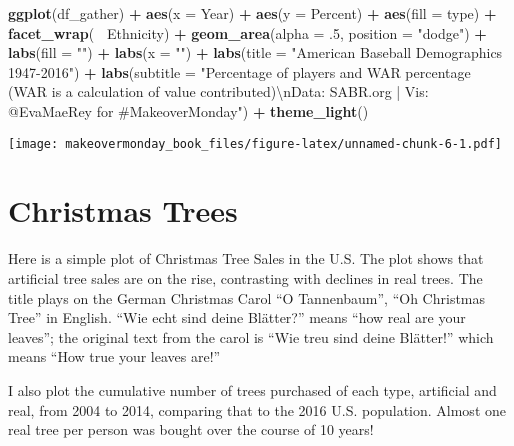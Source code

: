 \documentclass[]{book}
\newenvironment{Shaded}{\begin{snugshade}}{\end{snugshade}}
\newcommand{\KeywordTok}[1]{\textcolor[rgb]{0.13,0.29,0.53}{\textbf{#1}}}
\newcommand{\DataTypeTok}[1]{\textcolor[rgb]{0.13,0.29,0.53}{#1}}
\newcommand{\DecValTok}[1]{\textcolor[rgb]{0.00,0.00,0.81}{#1}}
\newcommand{\CharTok}[1]{\textcolor[rgb]{0.31,0.60,0.02}{#1}}
\newcommand{\StringTok}[1]{\textcolor[rgb]{0.31,0.60,0.02}{#1}}
\newcommand{\OperatorTok}[1]{\textcolor[rgb]{0.81,0.36,0.00}{\textbf{#1}}}
\newcommand{\NormalTok}[1]{#1}
\theoremstyle{definition}
\theoremstyle{definition}
\theoremstyle{definition}
\theoremstyle{remark}
\begin{document}
\begin{Shaded}
\begin{Highlighting}[]
\KeywordTok{ggplot}\NormalTok{(df_gather) }\OperatorTok{+}
\StringTok{  }\KeywordTok{aes}\NormalTok{(}\DataTypeTok{x =}\NormalTok{ Year) }\OperatorTok{+}
\StringTok{  }\KeywordTok{aes}\NormalTok{(}\DataTypeTok{y =}\NormalTok{ Percent) }\OperatorTok{+}
\StringTok{  }\KeywordTok{aes}\NormalTok{(}\DataTypeTok{fill =}\NormalTok{ type) }\OperatorTok{+}
\StringTok{  }\KeywordTok{facet_wrap}\NormalTok{(}\OperatorTok{~}\StringTok{ }\NormalTok{Ethnicity) }\OperatorTok{+}
\StringTok{  }\KeywordTok{geom_area}\NormalTok{(}\DataTypeTok{alpha =}\NormalTok{ .}\DecValTok{5}\NormalTok{, }\DataTypeTok{position =} \StringTok{"dodge"}\NormalTok{) }\OperatorTok{+}
\StringTok{  }\KeywordTok{labs}\NormalTok{(}\DataTypeTok{fill =} \StringTok{""}\NormalTok{) }\OperatorTok{+}
\StringTok{  }\KeywordTok{labs}\NormalTok{(}\DataTypeTok{x =} \StringTok{""}\NormalTok{) }\OperatorTok{+}
\StringTok{  }\KeywordTok{labs}\NormalTok{(}\DataTypeTok{title =} \StringTok{"American Baseball Demographics 1947-2016"}\NormalTok{) }\OperatorTok{+}
\StringTok{  }\KeywordTok{labs}\NormalTok{(}\DataTypeTok{subtitle =} \StringTok{"Percentage of players and WAR percentage (WAR is a calculation of value contributed)}\CharTok{\textbackslash{}n}\StringTok{Data: SABR.org | Vis: @EvaMaeRey for #MakeoverMonday"}\NormalTok{) }\OperatorTok{+}
\StringTok{  }\KeywordTok{theme_light}\NormalTok{() }
\end{Highlighting}
\end{Shaded}

\texttt{[image: makeovermonday\_book\_files/figure-latex/unnamed-chunk-6-1.pdf]}

\chapter{Christmas Trees}\label{christmas-trees}

Here is a simple plot of Christmas Tree Sales in the U.S. The plot shows
that artificial tree sales are on the rise, contrasting with declines in
real trees. The title plays on the German Christmas Carol ``O
Tannenbaum'', ``Oh Christmas Tree'' in English. ``Wie echt sind deine
Blätter?'' means ``how real are your leaves''; the original text from
the carol is ``Wie treu sind deine Blätter!'' which means ``How true
your leaves are!''

I also plot the cumulative number of trees purchased of each type,
artificial and real, from 2004 to 2014, comparing that to the 2016 U.S.
population. Almost one real tree per person was bought over the course
of 10 years!
\end{document}
